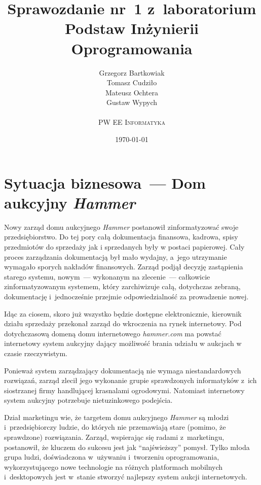 \documentclass[10pt,a4paper]{article}
\begin{document}
\title{
  Sprawozdanie nr~1 z~laboratorium\\Podstaw Inżynierii Oprogramowania
}
\author{
  Grzegorz Bartkowiak\\
  Tomasz Cudziło\\
  Mateusz Ochtera\\
  Gustaw Wypych\\
  \\
  \textsc{PW EE Informatyka}\\[10pt]
}
\date{\today}

\maketitle

\section{Sytuacja biznesowa~--- Dom aukcyjny \emph{Hammer}}
Nowy zarząd domu aukcyjnego \emph{Hammer} postanowił zinformatyzować swoje
przedsiębiorstwo. Do tej pory całą dokumentacja finansowa, kadrowa, spisy
przedmiotów do sprzedaży jak i sprzedanych były w postaci papierowej. Cały
proces zarządzania dokumentacją był mało wydajny, a~jego utrzymanie wymagało
sporych nakładów finansowych. Zarząd podjął decyzję zastąpienia starego
systemu, nowym~--- wykonanym na zlecenie~--- całkowicie zinformatyzowanym
systemem, który zarchiwizuje całą, dotychczas zebraną, dokumentację
i~jednocześnie przejmie odpowiedzialność za prowadzenie nowej.

Idąc za ciosem, skoro już wszystko będzie dostępne elektronicznie, kierownik
działu sprzedaży przekonał zarząd do wkroczenia na rynek internetowy. Pod
dotychczasową domeną domu internetowego \emph{hammer.com} ma powstać
internetowy system aukcyjny dający możliwość brania udziału w aukcjach w czasie
rzeczywistym.

Ponieważ system zarządzający dokumentacją nie wymaga niestandardowych
rozwiązań, zarząd zlecił jego wykonanie grupie sprawdzonych informatyków z~ich
siostrzanej firmy handlującej krasnalami ogrodowymi. Natomiast internetowy
system aukcyjny potrzebuje nietuzinkowego podejścia.

Dział marketingu wie, że targetem domu aukcyjnego \emph{Hammer} są młodzi
i~przedsiębiorczy ludzie, do których nie przemawiają stare (pomimo, że
sprawdzone) rozwiązania. Zarząd, wspierając się radami z~marketingu,
postanowił, że kluczem do sukcesu jest jak ``najświeższy'' pomysł. Tylko młoda
grupa ludzi, doświadczona w~używaniu i~tworzeniu oprogramowania,
wykorzystującego nowe technologie na różnych platformach mobilnych
i~desktopowych jest w~stanie stworzyć najlepszy system aukcji internetowych.
\end{document}
